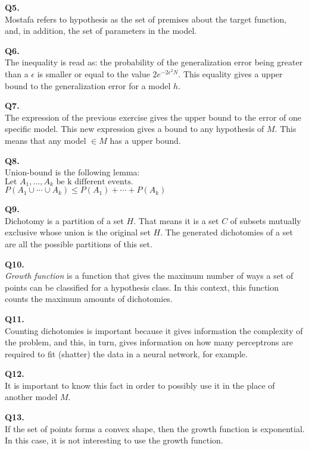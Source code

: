 \documentclass[]{article}
\begin{document}
	\noindent
	\textbf{Q5.}\\
	Mostafa refers to hypothesis as the set of premises about the target function, and, in addition, the set of parameters in the model.
	
	\noindent
	\textbf{Q6.}\\
	The inequality is read as: the probability of the generalization error being greater than a $\epsilon$ is smaller or equal to the value $2e^{-2\epsilon^2N}$. This equality gives a upper bound to the generalization error for a model $h$.
	
	\noindent
	\textbf{Q7.}\\
	The expression of the previous exercise gives the upper bound to the error of one specific model. This new expression gives a bound to any hypothesis of $M$. This means that any model $\in M$ has a upper bound.
	
	\newpage
	\noindent
	\textbf{Q8.}\\
	Union-bound is the following lemma:\\
	$\text{Let } A_1, ..., A_k \text{ be k different events.}$\\
	$P(A_1 \cup \cdots \cup A_k) \leq P(A_1) + \cdots + P(A_k)$
	
	\noindent
	\textbf{Q9.}\\
	Dichotomy is a partition of a set $H$. That means it is a set $C$ of subsets mutually exclusive whose union is the original set $H$. The generated dichotomies of a set are all the possible partitions of this set.
	
	\noindent
	\textbf{Q10.}\\
	\textit{Growth function} is a function that gives the maximum number of ways a set of points can be classified for a hypothesis class. In this context, this function counts the maximum amounts of dichotomies.
	
	\noindent
	\textbf{Q11.}\\
	Counting dichotomies is important because it gives information the complexity of the problem, and this, in turn, gives information on how many perceptrons are required to fit (shatter) the data in a neural network, for example.
	
	\noindent
	\textbf{Q12.}\\
	It is important to know this fact in order to possibly use it in the place of another model $M$.
	
	\noindent
	\textbf{Q13.}\\
	If the set of points forms a convex shape, then the growth function is exponential. In this case, it is not interesting to use the growth function.
	
\end{document}
